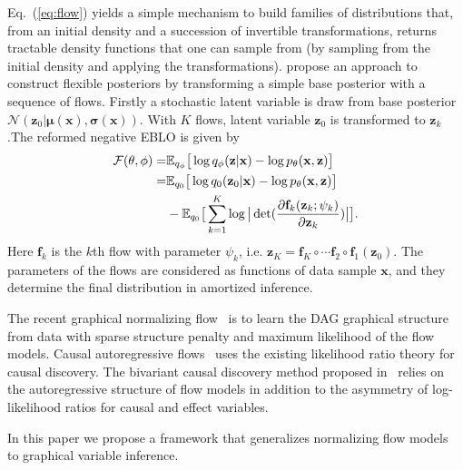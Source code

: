 \documentclass[twoside]{article}
\begin{document}
Eq.~(\ref{eq:flow}) yields a simple mechanism to build families of distributions that, from an initial density and a succession of invertible transformations, returns tractable density functions that one can sample from (by sampling from the initial density and applying the transformations). \cite{rezende2015variational} propose an approach to construct flexible posteriors by transforming  a simple base posterior with a sequence of flows. Firstly a stochastic latent variable is draw from base posterior $\mathcal{N}(\mathbf{z}_0|\mathbf{\mu}(\mathbf{x}), \mathbf{\sigma}(\mathbf{x}) )$. With $K$ flows, latent variable $\mathbf{z}_0$ is transformed to $\mathbf{z}_k$.The reformed negative EBLO is given by 
\begin{align}\label{eq:flow2}
\mathcal{F}(\theta, \phi) = & \mathbb{E}_{q_{\phi}} \big[\log q_{\phi}(\mathbf{z}|\mathbf{x}) -  \log p_{\theta}(\mathbf{x},\mathbf{z}) \big] \\ \notag
= & \mathbb{E}_{q_{0}} \big[\log q_{0}(\mathbf{z}_0|\mathbf{x}) -  \log p_{\theta}(\mathbf{x},\mathbf{z}) \big] \\ \notag
&-\mathbb{E}_{q_{0}} \big[\sum_{k=1}^K \log\big|\det(\frac{\partial \mathbf{f}_k( \mathbf{z}_k; \psi_k)}{\partial \mathbf{z}_k}) \big| \big].
\end{align}
Here $\mathbf{f}_k$ is the $k$th flow with parameter $\psi_k$, i.e. $\mathbf{z}_K = \mathbf{f}_K \circ \cdots  \mathbf{f}_2 \circ  \mathbf{f}_1(\mathbf{z}_0)$. The parameters of the flows are considered as functions of data sample $\mathbf{x}$, and they determine the final distribution in amortized inference.


The recent graphical normalizing flow~\cite{wehenkel2021graphical} is to learn the DAG graphical structure from data with sparse structure penalty and maximum likelihood of the flow models. Causal autoregressive flows~\cite{khemakhem2021causal}  uses the existing likelihood ratio theory for causal discovery. The bivariant causal discovery method proposed in~\cite{khemakhem2021causal} relies on the autoregressive structure of flow models in addition to the asymmetry of log-likelihood ratios for causal and effect variables.

In this paper we propose a framework that generalizes normalizing flow models~\cite{rezende2015variational,berg2018sylvester} to graphical variable inference.
\end{document}
